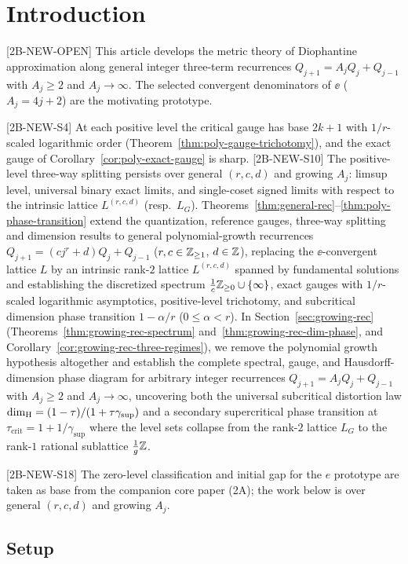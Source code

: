 
\section{Introduction}

[2B-NEW-OPEN] This article develops the metric theory of Diophantine
approximation along general integer three-term recurrences
$Q_{j+1}=A_jQ_j+Q_{j-1}$ with $A_j\ge2$ and $A_j\to\infty$.
The selected convergent denominators of $\ee$ ($A_j=4j+2$) are the
motivating prototype.

[2B-NEW-S4] At each positive level the critical gauge has base $2k+1$
with $1/r$-scaled logarithmic order
(Theorem~\ref{thm:poly-gauge-trichotomy}), and the exact gauge of
Corollary~\ref{cor:poly-exact-gauge} is sharp.
[2B-NEW-S10] The positive-level three-way splitting persists over general
$(r,c,d)$ and growing $A_j$: limsup level, universal binary exact limits,
and single-coset signed limits with respect to the intrinsic lattice
$L^{(r,c,d)}$ (resp.\ $L_G$). Theorems~\ref{thm:general-rec}--\ref{thm:poly-phase-transition}
extend the quantization, reference gauges, three-way splitting and
dimension results to general polynomial-growth recurrences
$Q_{j+1}=(cj^r+d)Q_j+Q_{j-1}$ ($r,c\in\mathbb{Z}_{\ge1}$, $d\in\mathbb{Z}$), replacing the
$\ee$-convergent lattice $L$ by an intrinsic rank-$2$ lattice $L^{(r,c,d)}$
spanned by fundamental solutions and establishing the discretized spectrum
$\frac1c\mathbb{Z}_{\ge0}\cup\{\infty\}$, exact gauges with $1/r$-scaled logarithmic
asymptotics, positive-level trichotomy, and subcritical dimension phase
transition $1-\alpha/r$ ($0\le\alpha<r$). In Section~\ref{sec:growing-rec}
(Theorems~\ref{thm:growing-rec-spectrum} and~\ref{thm:growing-rec-dim-phase},
and Corollary~\ref{cor:growing-rec-three-regimes}), we remove the polynomial
growth hypothesis altogether and establish the complete spectral, gauge, and
Hausdorff-dimension phase diagram for arbitrary integer recurrences
$Q_{j+1}=A_jQ_j+Q_{j-1}$ with $A_j\ge2$ and $A_j\to\infty$, uncovering both the
universal subcritical distortion law $\dim_{\mathrm{H}}=(1-\tau)/(1+\tau\gamma_{\sup})$ and
a secondary supercritical phase transition at $\tau_{\mathrm{crit}}=1+1/\gamma_{\sup}$
where the level sets collapse from the rank-$2$ lattice $L_G$ to the rank-$1$
rational sublattice $\frac{1}{g}\mathbb{Z}$.

[2B-NEW-S18] The zero-level classification and initial gap for the $e$
prototype are taken as base from the companion core paper (2A); the work
below is over general $(r,c,d)$ and growing $A_j$.

\subsection{Setup}

